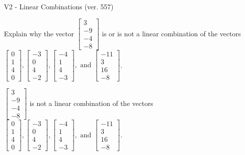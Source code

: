 \begin{exercise}
  \begin{exerciseTitle}V2 - Linear Combinations (ver. 557)\end{exerciseTitle}
  \begin{exerciseStatement}
    Explain why the vector \(\left[\begin{array}{c}
3 \\
-9 \\
-4 \\
-8
\end{array}\right]\)  is or is not a linear 
	combination of the vectors \(\left[\begin{array}{c}
0 \\
1 \\
4 \\
0
\end{array}\right] , \left[\begin{array}{c}
-3 \\
0 \\
4 \\
-2
\end{array}\right] , \left[\begin{array}{c}
-4 \\
1 \\
4 \\
-3
\end{array}\right] , \text{ and } \left[\begin{array}{c}
-11 \\
3 \\
16 \\
-8
\end{array}\right]\).
	


  \end{exerciseStatement}
  \begin{exerciseAnswer}
   \(\left[\begin{array}{c}
3 \\
-9 \\
-4 \\
-8
\end{array}\right]\) 
  	 is not  
	a linear combination of the vectors \(\left[\begin{array}{c}
0 \\
1 \\
4 \\
0
\end{array}\right] , \left[\begin{array}{c}
-3 \\
0 \\
4 \\
-2
\end{array}\right] , \left[\begin{array}{c}
-4 \\
1 \\
4 \\
-3
\end{array}\right] , \text{ and } \left[\begin{array}{c}
-11 \\
3 \\
16 \\
-8
\end{array}\right]\).


\end{exerciseAnswer}
\end{exercise}
